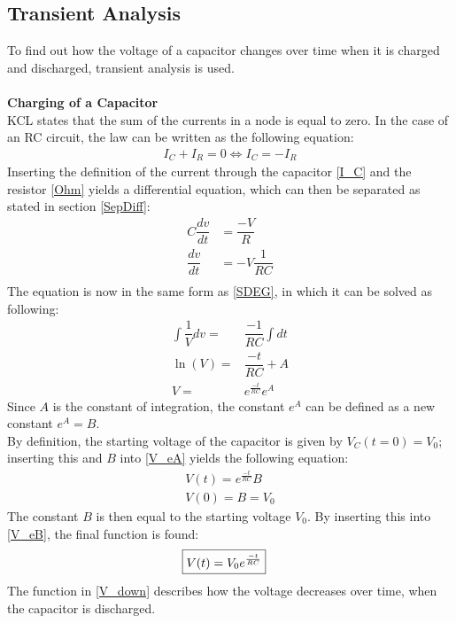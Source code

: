 \subsection{Transient Analysis}
\label{sec371}
To find out how the voltage of a capacitor changes over time when it is charged and discharged, transient analysis is used.
\\
\\
\textbf{Charging of a Capacitor}\\
KCL states that the sum of the currents in a node is equal to zero. In the case of an RC circuit, the law can be written as the following equation:
\begin{align*}
I_{C}+I_{R}=0 \Leftrightarrow 
I_{C}= -I_{R}
\end{align*}
Inserting the definition of the current through the capacitor \eqref{I_C} and the resistor \eqref{Ohm} yields a differential equation, which can then be separated as stated in section \ref{SepDiff}:
\begin{align*}
C \dfrac{dv}{dt}&=\dfrac{-V}{R} \\
\dfrac{dv}{dt} &= -V\dfrac{1}{RC} \\
\end{align*}
The equation is now in the same form as \eqref{SDEG}, in which it can be solved as following:
\begin{align}
\int \dfrac{1}{V}dv =& \dfrac{-1}{RC} \int dt\nonumber \\
\ln(V) =& \dfrac{-t}{RC} + A \nonumber\\
V =& e^{\frac{-t}{RC}}e^{A}\label{V_eA}
\end{align}
Since $A$ is the constant of integration, the constant $e^A$ can be defined as a new constant $e^A=B$.
\\
By definition, the starting voltage of the capacitor is given by $V_C(t=0)=V_0$; inserting this and $B$ into \eqref{V_eA} yields the following equation: 
\begin{align}
V(t)= e^{\frac{-t}{RC}}B \label{V_eB}\\
V(0)= B = V_0\nonumber
\end{align}
The constant $B$ is then equal to the starting voltage $V_0$. By inserting this into \eqref{V_eB}, the final function is found:
\begin{align}
\label{V_down}
\Aboxed{
 V(t) = V_0e^{\frac{-t}{RC}}
 }
\end{align}
The function in \eqref{V_down} describes how the voltage decreases over time, when the capacitor is discharged.
\\
